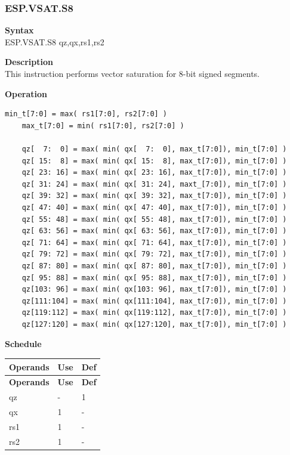 \newpage
\subsubsection{ESP.VSAT.S8}\label{instruction:ESPVSATS8}
\textbf{Syntax}\\
ESP.VSAT.S8 qz,qx,rs1,rs2

\textbf{Description}\\
This instruction performs vector saturation for 8-bit signed segments.

\textbf{Operation}\\
\begin{lstlisting}[escapeinside=`?]
    min_t[7:0] = max( rs1[7:0], rs2[7:0] )
    max_t[7:0] = min( rs1[7:0], rs2[7:0] )

    qz[  7:  0] = max( min( qx[  7:  0], max_t[7:0]), min_t[7:0] )
    qz[ 15:  8] = max( min( qx[ 15:  8], max_t[7:0]), min_t[7:0] )
    qz[ 23: 16] = max( min( qx[ 23: 16], max_t[7:0]), min_t[7:0] )
    qz[ 31: 24] = max( min( qx[ 31: 24], maxt_[7:0]), min_t[7:0] )
    qz[ 39: 32] = max( min( qx[ 39: 32], max_t[7:0]), min_t[7:0] )
    qz[ 47: 40] = max( min( qx[ 47: 40], max_t[7:0]), min_t[7:0] )
    qz[ 55: 48] = max( min( qx[ 55: 48], max_t[7:0]), min_t[7:0] )
    qz[ 63: 56] = max( min( qx[ 63: 56], max_t[7:0]), min_t[7:0] )
    qz[ 71: 64] = max( min( qx[ 71: 64], max_t[7:0]), min_t[7:0] )
    qz[ 79: 72] = max( min( qx[ 79: 72], max_t[7:0]), min_t[7:0] )
    qz[ 87: 80] = max( min( qx[ 87: 80], max_t[7:0]), min_t[7:0] )
    qz[ 95: 88] = max( min( qx[ 95: 88], max_t[7:0]), min_t[7:0] )
    qz[103: 96] = max( min( qx[103: 96], max_t[7:0]), min_t[7:0] )
    qz[111:104] = max( min( qx[111:104], max_t[7:0]), min_t[7:0] )
    qz[119:112] = max( min( qx[119:112], max_t[7:0]), min_t[7:0] )
    qz[127:120] = max( min( qx[127:120], max_t[7:0]), min_t[7:0] )
\end{lstlisting}

\textbf{Schedule}\\
\begin{longtable}[c]{|l|l|l|}
    \hline
    \rowcolor{lightgray}
    \textbf{Operands} & \textbf{Use} & \textbf{Def} \\\hline
    \endfirsthead
    \hline
    \rowcolor{lightgray}
     \textbf{Operands} & \textbf{Use} & \textbf{Def} \\\hline
    \endhead
    \hline
    \endfoot

  qz & - & 1 \\\hline
    qx & 1 & - \\\hline
    rs1 & 1 & - \\\hline
    rs2 & 1 & -

\end{longtable}

